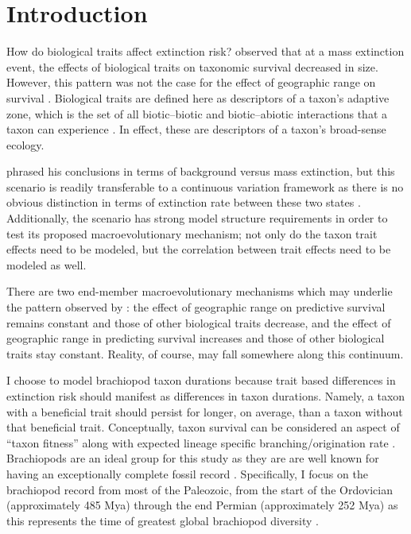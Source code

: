 \documentclass{article}
\begin{document}
\section{Introduction}

How do biological traits affect extinction risk? \citet{Jablonski1986} observed that at a mass extinction event, the effects of biological traits on taxonomic survival decreased in size. However, this pattern was not the case for the effect of geographic range on survival \citep{Jablonski1986}. Biological traits are defined here as descriptors of a taxon's adaptive zone, which is the set of all biotic--biotic and biotic--abiotic interactions that a taxon can experience \citep{Simpson1944}. In effect, these are descriptors of a taxon's broad-sense ecology.

\citet{Jablonski1986} phrased his conclusions in terms of background versus mass extinction, but this scenario is readily transferable to a continuous variation framework as there is no obvious distinction in terms of extinction rate between these two states \citep{Wang2003}. Additionally, the \citet{Jablonski1986} scenario has strong model structure requirements in order to test its proposed macroevolutionary mechanism; not only do the taxon trait effects need to be modeled, but the correlation between trait effects need to be modeled as well. 

There are two end-member macroevolutionary mechanisms which may underlie the pattern observed by \citet{Jablonski1986}: the effect of geographic range on predictive survival remains constant and those of other biological traits decrease, and the effect of geographic range in predicting survival increases and those of other biological traits stay constant. Reality, of course, may fall somewhere along this continuum.

I choose to model brachiopod taxon durations because trait based differences in extinction risk should manifest as differences in taxon durations. Namely, a taxon with a beneficial trait should persist for longer, on average, than a taxon without that beneficial trait. Conceptually, taxon survival can be considered an aspect of ``taxon fitness'' along with expected lineage specific branching/origination rate \citep{Cooper1984,Palmer2012}. Brachiopods are an ideal group for this study as they are are well known for having an exceptionally complete fossil record \citep{Foote2000a}. Specifically, I focus on the brachiopod record from most of the Paleozoic, from the start of the Ordovician (approximately 485 Mya) through the end Permian (approximately 252 Mya) as this represents the time of greatest global brachiopod diversity \citep{Alroy2010}.
\end{document}
